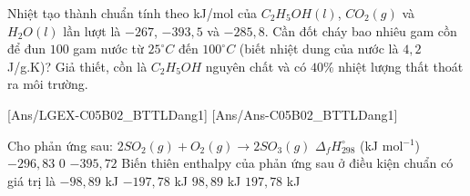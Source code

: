 \documentclass[Main.tex]{subfiles}
\begin{document}
	\begin{bt}
		Nhiệt tạo thành chuẩn tính theo kJ/mol của $C_2H_5OH(l)$, $CO_2(g)$ và $H_2O(l)$ lần lượt là $-267$, $-393{,}5$ và $-285{,}8$. Cần đốt cháy bao nhiêu gam cồn để đun $100$ gam nước từ $25^\circ C$ đến $100^\circ C$ (biết nhiệt dung của nước là $4{,}2$ J/g.K)? Giả thiết, cồn là $C_2H_5OH$ nguyên chất và có $40 \%$ nhiệt lượng thất thoát ra môi trường.
	\end{bt}
	[Ans/LGEX-C05B02_BTTLDang1]
	[Ans/Ans-C05B02_BTTLDang1]
	\begin{ex}Cho phản ứng sau: $2SO_2 (g) + O_2 (g) \rightarrow 2SO_3 (g)$
		$\Delta_f H_{298}^\circ$ (kJ mol$^{-1}$)
		$-296{,}83$ $0$ $-395{,}72$
		Biến thiên enthalpy của phản ứng sau ở điều kiện chuẩn có giá trị là
		\choice
		{$-98{,}89$ kJ}
		{\True $-197{,}78$ kJ}
		{$98{,}89$ kJ}
		{$197{,}78$ kJ}
	\end{ex}
	
\end{document}
